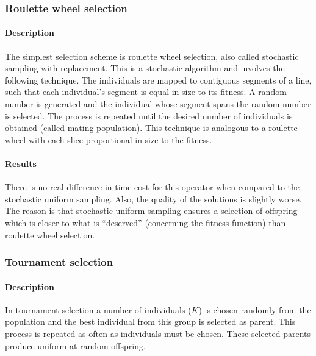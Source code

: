 ﻿\documentclass[a4paper,english,11pt,]{scrartcl}
\begin{document}
\subsubsection{Roulette wheel selection}
\paragraph{Description}
The simplest selection scheme is roulette wheel selection, also called stochastic sampling with replacement. This is a stochastic algorithm and involves the following technique. The individuals are mapped to contiguous segments of a line, such that each individual's segment is equal in size to its fitness. A random number is generated and the individual whose segment spans the random number is selected. The process is repeated until the desired number of individuals is obtained (called mating population). This technique is analogous to a roulette wheel with each slice proportional in size to the fitness. 
\paragraph{Results}
There is no real difference in time cost for this operator when compared to the stochastic uniform sampling. Also, the quality of the solutions is slightly worse. The reason is that stochastic uniform sampling ensures a selection of offspring which is closer to what is ``deserved'' (concerning the fitness function) than roulette wheel selection.


% 


\subsubsection{Tournament selection}
\paragraph{Description}
In tournament selection a number of individuals ($K$) is chosen randomly from the population and the best individual from this group is selected as parent. This process is repeated as often as individuals must be chosen. These selected parents produce uniform at random offspring.
\end{document}
